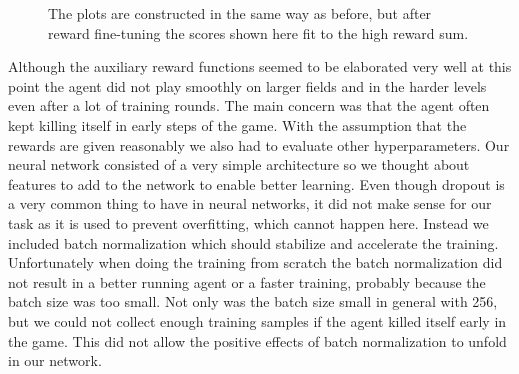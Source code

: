 \begin{figure}[H]
\begin{minipage}{0.49\textwidth}
    \end{minipage}
    \caption{The plots are constructed in the same way as before, but after reward fine-tuning the scores shown here fit to the high reward sum.}
    \label{fig:efficientCoinHeaven}
\end{figure}

Although the auxiliary reward functions seemed to be elaborated very well at this point the agent did not play smoothly on larger fields and in the harder levels even after a lot of training rounds. The main concern was that the agent often kept killing itself in early steps of the game. With the assumption that the rewards are given reasonably we also had to evaluate other hyperparameters. Our neural network consisted of a very simple architecture so we thought about features to add to the network to enable better learning. Even though dropout is a very common thing to have in neural networks, it did not make sense for our task as it is used to prevent overfitting, which cannot happen here. Instead we included batch normalization which should stabilize and accelerate the training. Unfortunately when doing the training from scratch the batch normalization did not result in a better running agent or a faster training, probably because the batch size was too small. Not only was the batch size small in general with 256, but we could not collect enough training samples if the agent killed itself early in the game. This did not allow the positive effects of batch normalization to unfold in our network.

